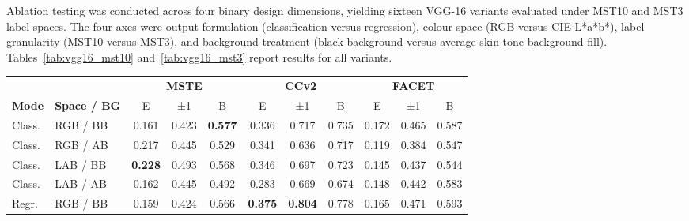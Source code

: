 Ablation testing was conducted across four binary design dimensions, yielding sixteen VGG-16 variants evaluated under MST10 and MST3 label spaces. The four axes were output formulation (classification versus regression), colour space (RGB versus CIE L*a*b*), label granularity (MST10 versus MST3), and background treatment (black background versus average skin tone background fill). Tables~\ref{tab:vgg16_mst10} and~\ref{tab:vgg16_mst3} report results for all variants.

\begin{table}[H]
	\centering
	\footnotesize
	\begin{tabular}{llccccccccc}
		\toprule
		              &                     & \multicolumn{3}{c}{\textbf{MSTE}} & \multicolumn{3}{c}{\textbf{CCv2}} & \multicolumn{3}{c}{\textbf{FACET}}                                                                                                       \\
		\cmidrule(lr){3-5} \cmidrule(lr){6-8} \cmidrule(lr){9-11}
		\textbf{Mode} & \textbf{Space / BG} & E                                 & ±1                                & B                                  & E              & ±1             & B              & E              & ±1             & B              \\
		\midrule
		Class.        & RGB / BB            & 0.161                             & 0.423                             & \textbf{0.577}                     & 0.336          & 0.717          & 0.735          & 0.172          & 0.465          & 0.587          \\
		Class.        & RGB / AB            & 0.217                             & 0.445                             & 0.529                              & 0.341          & 0.636          & 0.717          & 0.119          & 0.384          & 0.547          \\
		Class.        & LAB / BB            & \textbf{0.228}                    & 0.493                             & 0.568                              & 0.346          & 0.697          & 0.723          & 0.145          & 0.437          & 0.544          \\
		Class.        & LAB / AB            & 0.162                             & 0.445                             & 0.492                              & 0.283          & 0.669          & 0.674          & 0.148          & 0.442          & 0.583          \\
		Regr.         & RGB / BB            & 0.159                             & 0.424                             & 0.566                              & \textbf{0.375} & \textbf{0.804} & 0.778          & 0.165          & 0.471          & 0.593          \\

\end{tabular}
\end{table}
